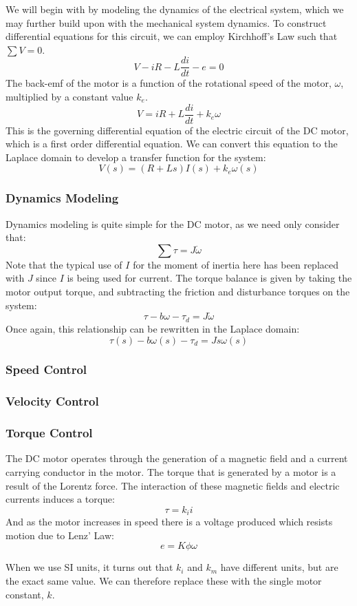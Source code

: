 We will begin with by modeling the dynamics of the electrical system, which we may further build upon with the mechanical system dynamics. To construct differential equations for this circuit, we can employ Kirchhoff's Law such that $\sum V=0$.
$$V-iR-L\frac{di}{dt}-e=0$$
The back-emf of the motor is a function of the rotational speed of the motor, $\omega$, multiplied by a constant value $k_e$.
$$V=iR+L\frac{di}{dt}+k_e\omega$$
This is the governing differential equation of the electric circuit of the DC motor, which is a first order differential equation. We can convert this equation to the Laplace domain to develop a transfer function for the system:
$$V(s) = (R+Ls)I(s)+k_e\omega(s)$$

\subsubsection{Dynamics Modeling}
Dynamics modeling is quite simple for the DC motor, as we need only consider that:
$$\sum\tau=J\dot{\omega}$$
Note that the typical use of $I$ for the moment of inertia here has been replaced with $J$ since $I$ is being used for current. The torque balance is given by taking the motor output torque, and subtracting the friction and disturbance torques on the system:
$$\tau-b\omega-\tau_d=J\dot{\omega}$$
Once again, this relationship can be rewritten in the Laplace domain:
$$\tau(s)-b\omega(s)-\tau_d=Js\omega(s)$$

\subsubsection{Speed Control}

\subsubsection{Velocity Control}

\subsubsection{Torque Control}
The DC motor operates through the generation of a magnetic field and a current carrying conductor in the motor. The torque that is generated by a motor is a result of the Lorentz force. The interaction of these magnetic fields and electric currents induces a torque:
$$\tau=k_ii$$
And as the motor increases in speed there is a voltage produced which resists motion due to Lenz' Law:
$$e=K\phi\omega$$

When we use SI units, it turns out that $k_i$ and $k_m$ have different units, but are the exact same value. We can therefore replace these with the single motor constant, $k$.


